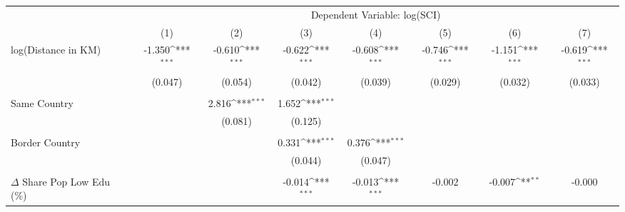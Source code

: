 {
\def\sym#1{\ifmmode^{#1}\else\(^{#1}\)\fi}
\begin{tabular}{l*{7}{c}}
\hline\hline
            &\multicolumn{7}{c}{Dependent Variable: log(SCI)}         &                     &                     &                     &                     &                     &                     \\
            &\multicolumn{1}{c}{(1)}         &\multicolumn{1}{c}{(2)}         &\multicolumn{1}{c}{(3)}         &\multicolumn{1}{c}{(4)}         &\multicolumn{1}{c}{(5)}         &\multicolumn{1}{c}{(6)}         &\multicolumn{1}{c}{(7)}         \\
\hline
log(Distance in KM)&      -1.350\sym{***}&      -0.610\sym{***}&      -0.622\sym{***}&      -0.608\sym{***}&      -0.746\sym{***}&      -1.151\sym{***}&      -0.619\sym{***}\\
            &     (0.047)         &     (0.054)         &     (0.042)         &     (0.039)         &     (0.029)         &     (0.032)         &     (0.033)         \\
            &                     &                     &                     &                     &                     &                     &                     \\
Same Country&                     &       2.816\sym{***}&       1.652\sym{***}&                     &                     &                     &                     \\
            &                     &     (0.081)         &     (0.125)         &                     &                     &                     &                     \\
            &                     &                     &                     &                     &                     &                     &                     \\
Border Country&                     &                     &       0.331\sym{***}&       0.376\sym{***}&                     &                     &                     \\
            &                     &                     &     (0.044)         &     (0.047)         &                     &                     &                     \\
            &                     &                     &                     &                     &                     &                     &                     \\
$\Delta$ Share Pop Low Edu (\%)&                     &                     &      -0.014\sym{***}&      -0.013\sym{***}&      -0.002         &      -0.007\sym{**} &      -0.000         \\

\end{tabular}}
